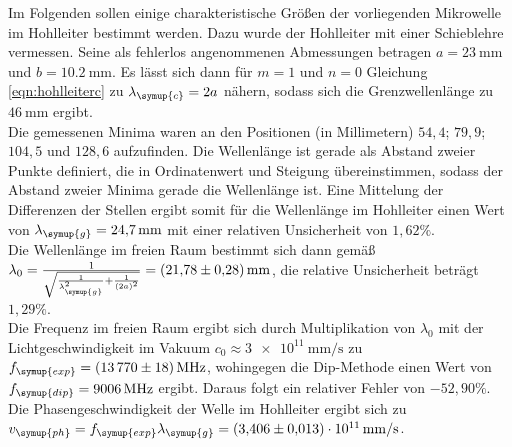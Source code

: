 Im Folgenden sollen einige charakteristische Größen der vorliegenden Mikrowelle im Hohlleiter bestimmt werden.
Dazu wurde der Hohlleiter mit einer Schieblehre vermessen. Seine als fehlerlos angenommenen Abmessungen betragen $a = \SI{23}{\milli\meter}$ und $b = \SI{10.2}{\milli\meter}$. Es lässt sich dann für $m=1$ und $n=0$ Gleichung \eqref{eqn:hohlleiterc} zu $\lambda_\symup{c} = 2a$ nähern, sodass sich die Grenzwellenlänge zu $\SI{46}{\milli\meter}$ ergibt.\\
Die gemessenen Minima waren an den Positionen (in Millimetern) $54{,}4$; $79{,}9$; $104{,}5$ und $128{,}6$ aufzufinden. Die Wellenlänge ist gerade als Abstand zweier Punkte definiert, die in Ordinatenwert und Steigung übereinstimmen, sodass der Abstand zweier Minima gerade die Wellenlänge ist. Eine Mittelung der Differenzen der Stellen ergibt somit für die Wellenlänge im Hohlleiter einen Wert von $\lambda_\symup{g} = \SI{24.7}{\milli\meter}$ mit einer relativen Unsicherheit von $1{,}62\%$.\\
Die Wellenlänge im freien Raum bestimmt sich dann gemäß $\lambda_0 = \frac{1}{\sqrt{ \frac{1}{\lambda_\symup{g}^2} + \frac{1}{(2a)^2}}} = \SI{21.78(28)}{\milli\meter}$, die relative Unsicherheit beträgt $1{,}29\%$.\\
Die Frequenz im freien Raum ergibt sich durch Multiplikation von $\lambda_0$ mit der Lichtgeschwindigkeit im Vakuum $c_0 \approx \SI{3e11}{\milli\meter\per\second}$ zu $f_\symup{exp} = \SI{13770(18)}{\mega\hertz}$, wohingegen die Dip-Methode einen Wert von $f_\symup{dip} = \SI{9006}{\mega\hertz}$ ergibt. Daraus folgt ein relativer Fehler von $-52{,}90\%$.\\
Die Phasengeschwindigkeit der Welle im Hohlleiter ergibt sich zu $v_\symup{ph} = f_\symup{exp} \lambda_\symup{g} = \SI{3.406(13)e+11}{\milli\meter\per\second}$.


